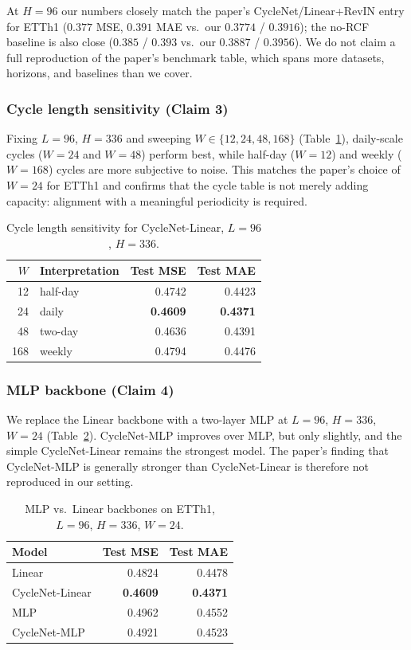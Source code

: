 \documentclass[10pt]{article}
\begin{document}
At $H{=}96$ our numbers closely match the paper's CycleNet/Linear+RevIN entry for ETTh1 ($0.377$ MSE, $0.391$ MAE vs.\ our $0.3774$ / $0.3916$); the no-RCF baseline is also close ($0.385$ / $0.393$ vs.\ our $0.3887$ / $0.3956$). We do not claim a full reproduction of the paper's benchmark table, which spans more datasets, horizons, and baselines than we cover.

\subsubsection{Cycle length sensitivity (Claim 3)}

Fixing $L{=}96$, $H{=}336$ and sweeping $W \in \{12,24,48,168\}$ (Table~\ref{tab:cycle}), daily-scale cycles ($W{=}24$ and $W{=}48$) perform best, while half-day ($W{=}12$) and weekly ($W{=}168$) cycles are more subjective to noise. This matches the paper's choice of $W{=}24$ for ETTh1 and confirms that the cycle table is not merely adding capacity: alignment with a meaningful periodicity is required.

\begin{table}[h]
\centering
\caption{Cycle length sensitivity for CycleNet-Linear, $L{=}96$, $H{=}336$.}
\label{tab:cycle}
\begin{tabular}{rlrr}
\toprule
$W$ & Interpretation & Test MSE & Test MAE \\
\midrule
12  & half-day  & 0.4742 & 0.4423 \\
24  & daily     & \textbf{0.4609} & \textbf{0.4371} \\
48  & two-day   & 0.4636 & 0.4391 \\
168 & weekly    & 0.4794 & 0.4476 \\
\bottomrule
\end{tabular}
\end{table}

\subsubsection{MLP backbone (Claim 4)}

We replace the Linear backbone with a two-layer MLP at $L{=}96$, $H{=}336$, $W{=}24$ (Table~\ref{tab:mlp}). CycleNet-MLP improves over MLP, but only slightly, and the simple CycleNet-Linear remains the strongest model. The paper's finding that CycleNet-MLP is generally stronger than CycleNet-Linear is therefore not reproduced in our setting.

\begin{table}[h]
\centering
\caption{MLP vs.\ Linear backbones on ETTh1, $L{=}96$, $H{=}336$, $W{=}24$.}
\label{tab:mlp}
\begin{tabular}{lrr}
\toprule
Model & Test MSE & Test MAE \\
\midrule
Linear           & 0.4824 & 0.4478 \\
CycleNet-Linear  & \textbf{0.4609} & \textbf{0.4371} \\
MLP              & 0.4962 & 0.4552 \\
CycleNet-MLP     & 0.4921 & 0.4523 \\
\bottomrule
\end{tabular}
\end{table}
\end{document}

